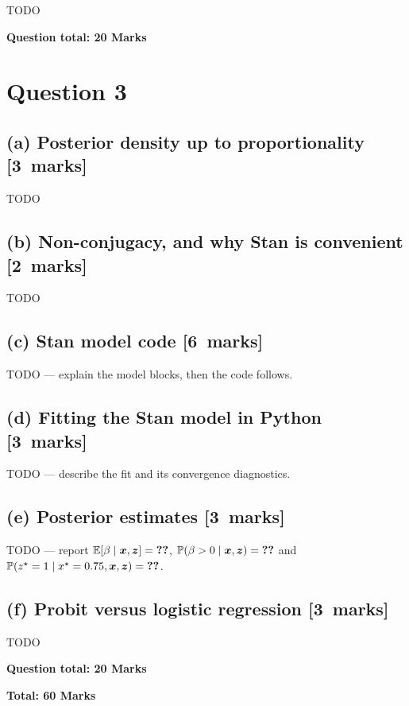 \documentclass[11pt,a4paper]{article}
\makeatletter
\newcommand{\x}{\bm{x}}
\newcommand{\z}{\bm{z}}
\newcommand{\E}{\mathbb{E}}
\newcommand{\Prob}{\mathbb{P}}
\newcommand{\pycode}[2]{}
\newcommand{\result}[1]{%
  \ifcsname result@#1\endcsname\csname result@#1\endcsname\else\textbf{??}\fi}
\newcommand{\partmarks}[1]{\hfill\normalfont\mbox{[#1 marks]}}
\newcommand{\questiontotal}[1]{%
  \vspace{6pt}\par\hfill\textbf{Question total: #1 Marks}\par}
\newcommand{\grandtotal}[1]{%
  \vspace{6pt}\par\hfill\textbf{Total: #1 Marks}\par}
\makeatother
\begin{document}
TODO

\questiontotal{20}

\clearpage
\section*{Question 3}

\subsection*{(a) Posterior density up to proportionality \partmarks{3}}

TODO

\subsection*{(b) Non-conjugacy, and why Stan is convenient \partmarks{2}}

TODO

\subsection*{(c) Stan model code \partmarks{6}}

TODO --- explain the model blocks, then the code follows.



\subsection*{(d) Fitting the Stan model in Python \partmarks{3}}

TODO --- describe the fit and its convergence diagnostics.

\pycode{q3_probit_stan}{q3d}

\subsection*{(e) Posterior estimates \partmarks{3}}

\pycode{q3_probit_stan}{q3e}

TODO --- report $\E[\beta\mid\x,\z]=\result{q3.e.beta}$,
$\Prob(\beta>0\mid\x,\z)=\result{q3.p.beta.positive}$ and
$\Prob(z^\star=1\mid x^\star=0.75,\x,\z)=\result{q3.p.zstar}$.

\subsection*{(f) Probit versus logistic regression \partmarks{3}}

TODO

\questiontotal{20}

\vspace{4pt}
\grandtotal{60}
\end{document}
